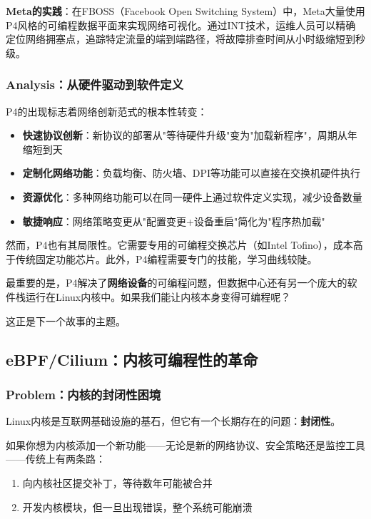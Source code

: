 \textbf{Meta的实践}：在FBOSS（Facebook Open Switching System）中，Meta大量使用P4风格的可编程数据平面来实现网络可视化。通过INT技术，运维人员可以精确定位网络拥塞点，追踪特定流量的端到端路径，将故障排查时间从小时级缩短到秒级。

\subsubsection{Analysis：从硬件驱动到软件定义}

P4的出现标志着网络创新范式的根本性转变：

\begin{itemize}
    \item \textbf{快速协议创新}：新协议的部署从"等待硬件升级"变为"加载新程序"，周期从年缩短到天
    \item \textbf{定制化网络功能}：负载均衡、防火墙、DPI等功能可以直接在交换机硬件执行
    \item \textbf{资源优化}：多种网络功能可以在同一硬件上通过软件定义实现，减少设备数量
    \item \textbf{敏捷响应}：网络策略变更从"配置变更+设备重启"简化为"程序热加载"
\end{itemize}

然而，P4也有其局限性。它需要专用的可编程交换芯片（如Intel Tofino），成本高于传统固定功能芯片。此外，P4编程需要专门的技能，学习曲线较陡。

最重要的是，P4解决了\textbf{网络设备}的可编程问题，但数据中心还有另一个庞大的软件栈运行在Linux内核中。如果我们能让内核本身变得可编程呢？

这正是下一个故事的主题。

\subsection{eBPF/Cilium：内核可编程性的革命}

\subsubsection{Problem：内核的封闭性困境}

Linux内核是互联网基础设施的基石，但它有一个长期存在的问题：\textbf{封闭性}。

如果你想为内核添加一个新功能——无论是新的网络协议、安全策略还是监控工具——传统上有两条路：
\begin{enumerate}
    \item 向内核社区提交补丁，等待数年可能被合并
    \item 开发内核模块，但一旦出现错误，整个系统可能崩溃
\end{enumerate}

